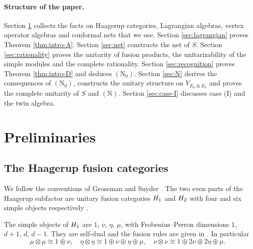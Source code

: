 \documentclass[leqno]{article}
\let\cal\relax
\newcommand{\cal}{\mathcal}
\newcommand{\ot}{\otimes}
\numberwithin{equation}{section}
\begin{document}
\paragraph{Structure of the paper.} Section \ref{sec:preliminaries} collects the facts on Haagerup categories, Lagrangian algebras, vertex operator algebras and conformal nets that we use. Section \ref{sec:lagrangian} proves Theorem \ref{thm:intro-A}. Section \ref{sec:net} constructs the net of $S$. Section \ref{sec:rationality} proves the unitarity of fusion products, the unitarizability of the simple modules and the complete rationality. Section \ref{sec:recognition} proves Theorem \ref{thm:intro-D} and deduces $\mathrm{(N_0)}$. Section \ref{sec:N} derives the consequences of $\mathrm{(N_0)}$, constructs the unitary structure on $V_{E_8 \oplus E_8}$ and proves the complete unitarity of $S$ and $\mathrm{(N)}$. Section \ref{sec:case-I} discusses case (I) and the twin algebra.

\section{Preliminaries}
\label{sec:preliminaries}

\subsection{The Haagerup fusion categories}
\label{subsec:haagerup-categories}

We follow the conventions of Grossman and Snyder \cite{GrS12}. The two even parts of the Haagerup subfactor are unitary fusion categories $\cal H_1$ and $\cal H_2$ with four and six simple objects respectively \cite[p.~14]{GrS12}.

The simple objects of $\cal H_1$ are $1$, $\nu$, $\eta$, $\mu$, with Frobenius--Perron dimensions $1$, $d+1$, $d$, $d-1$. They are self-dual and the fusion rules are given in \cite[Table 2 p.~15]{GrS12}. In particular
\begin{equation}
\label{eq:H1-rules}
\mu \ot \mu \cong 1 \oplus \nu,\quad \eta \ot \eta \cong 1 \oplus \nu \oplus \eta \oplus \mu,\quad \nu \ot \nu \cong 1 \oplus 2\nu \oplus 2\eta \oplus \mu.
\end{equation}
\end{document}
